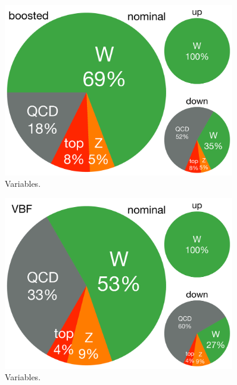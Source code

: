 \begin{figure}[tp]
  \centering
  \includegraphics[width=0.90\textwidth]{figures/backgrounds/rx-boost}
  \caption{Variables.}
  \label{fig:backgrounds-rx-boost}
\end{figure}

\begin{figure}[tp]
  \centering
  \includegraphics[width=0.90\textwidth]{figures/backgrounds/rx-vbf}
  \caption{Variables.}
  \label{fig:backgrounds-rx-vbf}
\end{figure}

